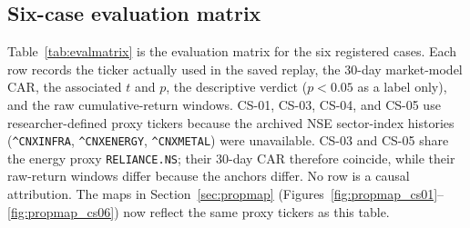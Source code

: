 \documentclass[10pt,a4paper,twocolumn]{article}
\newcommand{\CAR}{\mathrm{CAR}}
\begin{document}
\subsection{Six-case evaluation matrix}\label{sec:evalmatrix}

Table~\ref{tab:evalmatrix} is the evaluation matrix for the six registered cases. Each row records the ticker actually used in the saved replay, the 30-day market-model $\CAR$, the associated $t$ and $p$, the descriptive verdict ($p<0.05$ as a label only), and the raw cumulative-return windows. CS-01, CS-03, CS-04, and CS-05 use researcher-defined proxy tickers because the archived NSE sector-index histories (\texttt{\^{}CNXINFRA}, \texttt{\^{}CNXENERGY}, \texttt{\^{}CNXMETAL}) were unavailable. CS-03 and CS-05 share the energy proxy \texttt{RELIANCE.NS}; their 30-day $\CAR$ therefore coincide, while their raw-return windows differ because the anchors differ. No row is a causal attribution. The maps in Section~\ref{sec:propmap} (Figures~\ref{fig:propmap_cs01}--\ref{fig:propmap_cs06}) now reflect the same proxy tickers as this table.
\end{document}
